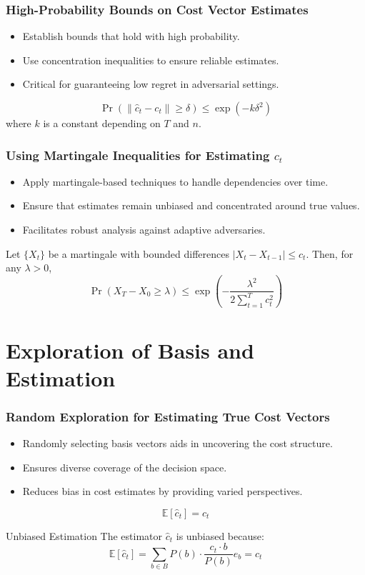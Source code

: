 \documentclass{beamer}
\begin{document}
\begin{frame}
\frametitle{High-Probability Bounds on Cost Vector Estimates}
\begin{itemize}
    \item Establish bounds that hold with high probability.
    \item Use concentration inequalities to ensure reliable estimates.
    \item Critical for guaranteeing low regret in adversarial settings.
\end{itemize}
\begin{equation*}
    \Pr\left( \|\hat{c}_t - c_t\| \geq \delta \right) \leq \exp(-k\delta^2)
\end{equation*}
where \( k \) is a constant depending on \( T \) and \( n \).
\end{frame}

\begin{frame}
\frametitle{Using Martingale Inequalities for Estimating \( c_t \)}
\begin{itemize}
    \item Apply martingale-based techniques to handle dependencies over time.
    \item Ensure that estimates remain unbiased and concentrated around true values.
    \item Facilitates robust analysis against adaptive adversaries.
\end{itemize}
\begin{theorem}
    Let \( \{X_t\} \) be a martingale with bounded differences \( |X_t - X_{t-1}| \leq c_t \). Then, for any \( \lambda > 0 \),
    \[
    \Pr\left( X_T - X_0 \geq \lambda \right) \leq \exp\left( -\frac{\lambda^2}{2 \sum_{t=1}^T c_t^2} \right)
    \]
\end{theorem}
\end{frame}

\section{Exploration of Basis and Estimation}

\begin{frame}
\frametitle{Random Exploration for Estimating True Cost Vectors}
\begin{itemize}
    \item Randomly selecting basis vectors aids in uncovering the cost structure.
    \item Ensures diverse coverage of the decision space.
    \item Reduces bias in cost estimates by providing varied perspectives.
\end{itemize}
\begin{equation*}
    \mathbb{E}[\hat{c}_t] = c_t
\end{equation*}
\begin{block}{Unbiased Estimation}
    The estimator \( \hat{c}_t \) is unbiased because:
    \[
    \mathbb{E}[\hat{c}_t] = \sum_{b \in B} P(b) \cdot \frac{c_t \cdot b}{P(b)} e_b = c_t
    \]
\end{block}
\end{frame}
\end{document}
